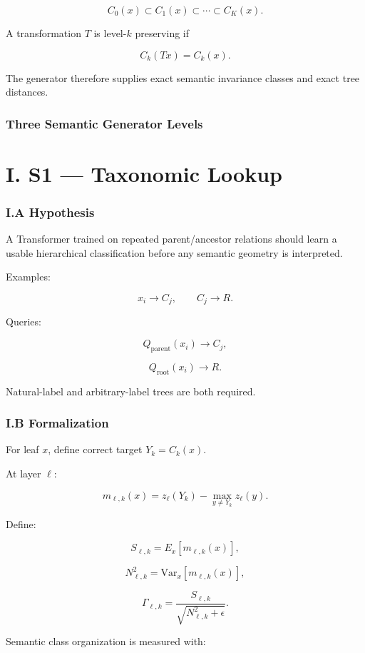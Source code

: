 \documentclass[10pt]{article}
\begin{document}
\[
C_0(x)\subset C_1(x)\subset \cdots \subset C_K(x).
\]

A transformation \(T\) is level-\(k\) preserving if

\[
C_k(Tx)=C_k(x).
\]

The generator therefore supplies exact semantic invariance classes and exact tree distances.

\section{Three Semantic Generator Levels}

\part{I. S1 --- Taxonomic Lookup}

\section{I.A Hypothesis}

A Transformer trained on repeated parent/ancestor relations should learn a usable hierarchical classification before any semantic geometry is interpreted.

Examples:

\[
x_i \to C_j,
\qquad
C_j \to R.
\]

Queries:

\[
Q_{\mathrm{parent}}(x_i)\to C_j,
\]

\[
Q_{\mathrm{root}}(x_i)\to R.
\]

Natural-label and arbitrary-label trees are both required.

\section{I.B Formalization}

For leaf \(x\), define correct target \(Y_k=C_k(x)\).

At layer \(\ell\):

\[
m_{\ell,k}(x)
=
z_\ell(Y_k)-\max_{y\neq Y_k}z_\ell(y).
\]

Define:

\[
S_{\ell,k}
=
E_x[m_{\ell,k}(x)],
\]

\[
N_{\ell,k}^2
=
\mathrm{Var}_x[m_{\ell,k}(x)],
\]

\[
\Gamma_{\ell,k}
=
\frac{S_{\ell,k}}
{\sqrt{N_{\ell,k}^2+\epsilon}}.
\]

Semantic class organization is measured with:
\end{document}
